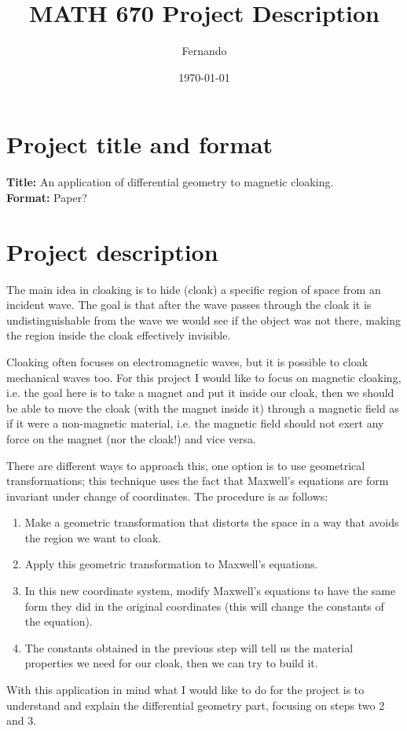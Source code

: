 \documentclass{article}
\begin{document}
\newcommand{\R}{\mathbb{R}}

\title{MATH 670 Project Description}
\author{Fernando}
\date{\today}
\maketitle

\section*{Project title and format}

\textbf{Title:} An application of differential geometry to magnetic cloaking.\\
\textbf{Format:} Paper?

\section*{Project description}

The main idea in cloaking is to hide (cloak) a specific region of space from an
incident wave. The goal is that after the wave passes through the cloak it is
undistinguishable from the wave we would see if the object was not there,
making the region inside the cloak effectively invisible.

Cloaking often focuses on electromagnetic waves, but it is possible to cloak
mechanical waves too. For this project I would like to focus on magnetic
cloaking, i.e. the goal here is to take a magnet and put it inside our cloak,
then we should be able to move the cloak (with the magnet inside it) through a
magnetic field as if it were a non-magnetic material, i.e. the magnetic field
should not exert any force on the magnet (nor the cloak!) and vice versa.

There are different ways to approach this, one option is to use geometrical
transformations; this technique uses the fact that Maxwell's equations are form
invariant under change of coordinates. The procedure is as follows:
\begin{enumerate}
\item

Make a geometric transformation that distorts the space in a way that avoids
the region we want to cloak.

\item

Apply this geometric transformation to Maxwell's equations.

\item

In this new coordinate system, modify Maxwell's equations to have the same
form they did in the original coordinates (this will change the constants of
the equation).

\item

The constants obtained in the previous step will tell us the material
properties we need for our cloak, then we can try to build it.

\end{enumerate}


With this application in mind what I would like to do for the project is to
understand and explain the differential geometry part, focusing on steps two 2
and 3.

\nocite{ward96}

\printbibliography
\end{document}
